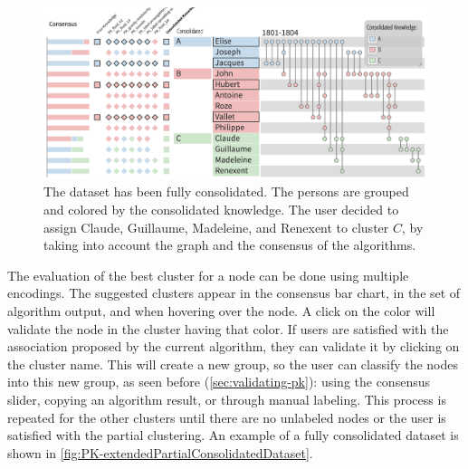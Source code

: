 \begin{figure}
\centering
\includegraphics[width=\linewidth]{static/figures/PK-Clustering/VISPaperFigures/Small-FinalPartition.png}
\caption{The dataset has been fully consolidated. The persons are grouped and colored by the consolidated knowledge. The user decided to assign Claude, Guillaume, Madeleine, and Renexent to cluster $C$, by taking into account the graph and the consensus of the algorithms.}
\label{fig:PK-extendedPartialConsolidatedDataset}
\end{figure}


The evaluation of the best cluster for a node can be done using multiple encodings.
The suggested clusters appear in the consensus bar chart, in the set of algorithm output, and when hovering over the node. A click on the color will validate the node in the cluster having that color.
If users are satisfied with the association proposed by the current algorithm, they can validate it by clicking on the cluster name. This will create a new group, so the user can classify the nodes into this new group, as seen before (\autoref{sec:validating-pk}): using the consensus slider, copying an algorithm result, or through manual labeling.
This process is repeated for the other clusters until there are no unlabeled nodes or the user is satisfied with the partial clustering. An example of a fully consolidated dataset is shown in \autoref{fig:PK-extendedPartialConsolidatedDataset}.

